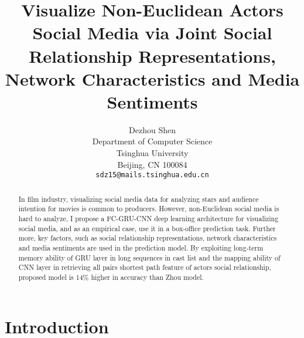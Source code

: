 \documentclass[review]{cvpr}
\begin{document}
\title{Visualize Non-Euclidean Actors Social Media via Joint Social Relationship Representations, Network Characteristics and Media Sentiments}

\author{Dezhou Shen\\
Department of Computer Science\\
Tsinghua University\\
Beijing, CN 100084\\
{\tt\small sdz15@mails.tsinghua.edu.cn}
}

\maketitle


\begin{abstract}
  In film industry, visualizing social media data for analyzing stars and audience intention for movies is common to producers.
  However, non-Euclidean social media is hard to analyze, I propose a FC-GRU-CNN deep learning architecture for visualizing social media, and as an empirical case, use it in a box-office prediction task.
  Further more, key factors, such as social relationship representations, network characteristics and media sentiments are used in the prediction model.
  By exploiting long-term memory ability of GRU layer in long sequences in cast list and the mapping ability of CNN layer in retrieving all pairs shortest path feature of actors social relationship,
  proposed model is 14\% higher in accuracy than Zhou \etal model.
\end{abstract}

\section{Introduction}
\end{document}
